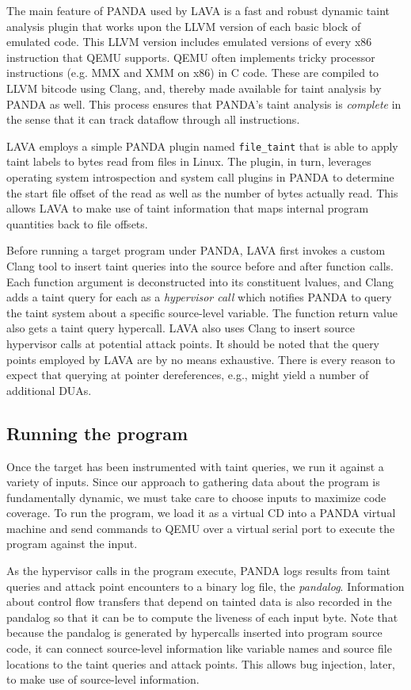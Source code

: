 The main feature of PANDA used by LAVA is a fast and robust dynamic taint analysis plugin that works upon the LLVM version of each 
basic block of emulated code.
This LLVM version includes emulated versions of every x86 instruction that QEMU supports.
QEMU often implements tricky processor instructions (e.g. MMX and XMM on x86) in C code.
These are compiled to LLVM bitcode using Clang, and, thereby made available for taint analysis by PANDA as well.
This process ensures that PANDA's taint analysis is \emph{complete} in the sense that it can track dataflow through all instructions.

LAVA employs a simple PANDA plugin named \verb+file_taint+ that is able to apply taint labels to bytes read from files in Linux.
The plugin, in turn, leverages operating system introspection and system call plugins in PANDA to determine the start file offset of the read as well as the number of bytes actually read.
This allows LAVA to make use of taint information that maps internal program quantities back to file offsets.

Before running a target program under PANDA, LAVA first invokes a custom Clang tool to insert taint queries into the source before and after function calls.
Each function argument is deconstructed into its constituent lvalues, and Clang adds a taint query for each as a \emph{hypervisor call} which notifies PANDA to query the taint system about a specific source-level variable.
The function return value also gets a taint query hypercall.
LAVA also uses Clang to insert source hypervisor calls at potential attack points.
It should be noted that the query points employed by LAVA are by no means exhaustive.
There is every reason to expect that querying at pointer dereferences, e.g., might yield a number of additional DUAs.


\subsection{Running the program}
Once the target has been instrumented with taint queries, we run it against a variety of inputs.
Since our approach to gathering data about the program is fundamentally dynamic, we must take care to choose inputs to maximize code coverage.
To run the program, we load it as a virtual CD into a PANDA virtual machine and send commands to QEMU over a virtual serial port to execute the program against the input.

As the hypervisor calls in the program execute, PANDA logs results from taint queries and attack point encounters to a binary log file, the \emph{pandalog}.
Information about control flow transfers that depend on tainted data is also recorded in the pandalog so that it can be to compute the liveness of each input byte.
Note that because the pandalog is generated by hypercalls inserted into program source code, it can connect source-level information like variable names and source file locations to the taint queries and attack points.
This allows bug injection, later, to make use of source-level information. 


